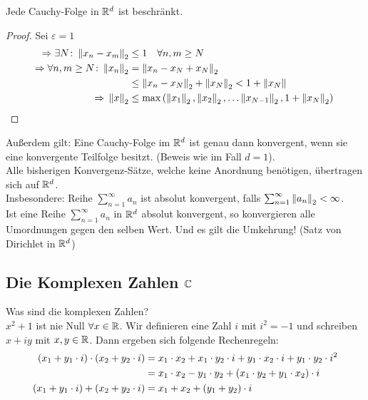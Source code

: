 \begin{beobachtung}
    Jede Cauchy-Folge in $\mathbb{R}^d$ ist beschränkt.
    \begin{proof}
        Sei $\varepsilon = 1$
        \begin{align*}
            \Rightarrow{} \exists N\colon\left\lVert x_n-x_m\right\rVert_2 &\leq 1\quad\forall n,m\geq N\\
            \Rightarrow{} \forall n,m\geq N\colon \left\lVert x_n\right\rVert_2 &= \left\lVert x_n-x_N+x_N\right\rVert_2\\
            &\leq \left\lVert x_n-x_N\right\rVert_2 + \left\lVert x_N\right\rVert_2 < 1 + \left\lVert x_N\right\rVert\\
            \Rightarrow{} \left\lVert x\right\rVert_2 &\leq \max\left(\left\lVert x_1\right\rVert_2, \left\lVert x_2\right\rVert_2,\dots\left\lVert x_{N-1}\right\rVert_2, 1+\left\lVert x_N\right\rVert_2\right)\qedhere
        \end{align*}
    \end{proof}
\end{beobachtung}

\begin{bemerkung}
    Außerdem gilt: Eine Cauchy-Folge im $\mathbb{R}^d$ ist genau dann konvergent, wenn sie eine konvergente Teilfolge besitzt. (Beweis wie im Fall $d=1$).\\
    Alle bisherigen Konvergenz-Sätze, welche keine Anordnung benötigen, übertragen sich auf $\mathbb{R}^d$.\\
    Insbesondere: Reihe $\sum_{n=1}^{\infty} a_n$ ist absolut konvergent, falls $\sum_{n=1}^{\infty} \left\lVert a_n\right\rVert_2 < \infty$.\\
    Ist eine Reihe $\sum_{n=1}^{\infty} a_n$ in $\mathbb{R}^d$ absolut konvergent, so konvergieren alle Umordnungen gegen den selben Wert. Und es gilt die Umkehrung! (Satz von Dirichlet in $\mathbb{R}^d$)
\end{bemerkung}

\subsection{Die Komplexen Zahlen $\mathbb{C}$}

Was sind die komplexen Zahlen?\\
$x^2+1$ ist nie Null $\forall x\in\mathbb{R}$. Wir definieren eine Zahl $i$ mit $i^2=-1$ und schreiben $x+iy$ mit $x,y\in\mathbb{R}$. Dann ergeben sich folgende Rechenregeln:
\begin{align*}
(x_1 + y_1\cdot i)
    \cdot (x_2 + y_2\cdot i) &= x_1\cdot x_2 + x_1\cdot y_2\cdot i + y_1 \cdot x_2 \cdot i + y_1\cdot y_2\cdot i^2\\
    &= x_1\cdot x_2 - y_1\cdot y_2 + \left(x_1\cdot y_2 + y_1\cdot x_2\right)\cdot i\\
    (x_1+y_1\cdot i) + (x_2 + y_2\cdot i) &= x_1 + x_2 + \left(y_1+y_2\right)\cdot i
\end{align*}

